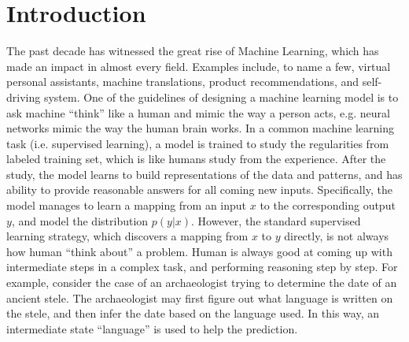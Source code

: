 \chapter{Introduction} \label{sec:ch-1}

The past decade has witnessed the great rise of Machine Learning, which has made an impact in almost every field. Examples include, to name a few, virtual personal assistants, machine translations, product recommendations, and self-driving system. One of the guidelines of designing a machine learning model is to ask machine ``think'' like a human and mimic the way a person acts, e.g. neural networks mimic the way the human brain works. In a common machine learning task (i.e. supervised learning), a model is trained to study the regularities from labeled training set, which is like humans study from the experience. After the study, the model learns to build representations of the data and patterns, and has ability to provide reasonable answers for all coming new inputs. Specifically, the model manages to learn a mapping from an input $x$ to the corresponding output $y$, and model the distribution $p(y|x)$. However, the standard supervised learning strategy, which discovers a mapping from $x$ to $y$ directly, is not always how human ``think about'' a problem. Human is always good at coming up with intermediate steps in a complex task, and performing reasoning step by step. For example, consider the case of an archaeologist trying to determine the date of an ancient stele. The archaeologist may first figure out what language is written on the stele, and then infer the date based on the language used. In this way, an intermediate state ``language'' is used to help the prediction. 

